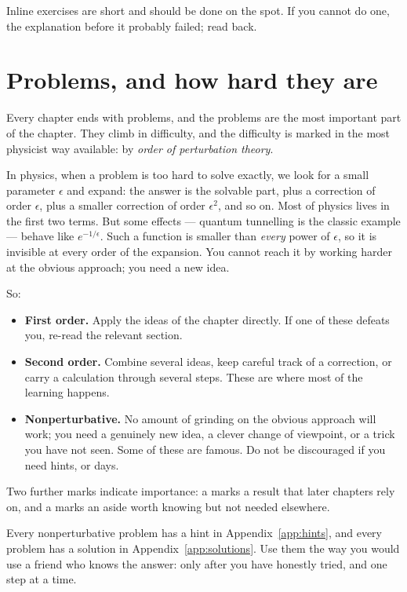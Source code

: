 \begin{exercise}
Inline exercises are short and should be done on the spot. If you cannot do one, the explanation before it probably failed; read back.
\end{exercise}

\section*{Problems, and how hard they are}

Every chapter ends with problems, and the problems are the most important part of the chapter. They climb in difficulty, and the difficulty is marked in the most physicist way available: by \emph{order of perturbation theory}.

In physics, when a problem is too hard to solve exactly, we look for a small parameter $\epsilon$ and expand: the answer is the solvable part, plus a correction of order $\epsilon$, plus a smaller correction of order $\epsilon^2$, and so on. Most of physics lives in the first two terms. But some effects --- quantum tunnelling is the classic example --- behave like $e^{-1/\epsilon}$. Such a function is smaller than \emph{every} power of $\epsilon$, so it is invisible at every order of the expansion. You cannot reach it by working harder at the obvious approach; you need a new idea.

So:
\begin{itemize}[itemsep=5pt]
  \item[\diffmark{1}] \textbf{First order.} Apply the ideas of the chapter directly. If one of these defeats you, re-read the relevant section.
  \item[\diffmark{2}] \textbf{Second order.} Combine several ideas, keep careful track of a correction, or carry a calculation through several steps. These are where most of the learning happens.
  \item[\diffmark{3}] \textbf{Nonperturbative.} No amount of grinding on the obvious approach will work; you need a genuinely new idea, a clever change of viewpoint, or a trick you have not seen. Some of these are famous. Do not be discouraged if you need hints, or days.
\end{itemize}
Two further marks indicate importance: a \core marks a result that later chapters rely on, and a \aside marks an aside worth knowing but not needed elsewhere.

Every nonperturbative problem has a hint in Appendix~\ref{app:hints}, and every problem has a solution in Appendix~\ref{app:solutions}. Use them the way you would use a friend who knows the answer: only after you have honestly tried, and one step at a time.

